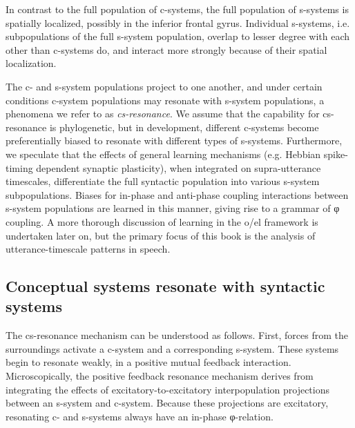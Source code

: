   In contrast to the full population of c-systems, the full population of s-systems is spatially localized, possibly in the inferior frontal gyrus. Individual s-systems, i.e. subpopulations of the full s-system population, overlap to lesser degree with each other than c-systems do, and interact more strongly because of their spatial localization. 

  The c- and s-system populations project to one another, and under certain conditions c-system populations may resonate with s-system populations, a phenomena we refer to as \textit{cs-resonance}. We assume that the capability for cs-resonance is phylogenetic, but in development, different c-systems become preferentially biased to resonate with different types of s-systems. Furthermore, we speculate that the effects of general learning mechanisms (e.g. Hebbian spike-timing dependent synaptic plasticity), when integrated on supra-utterance timescales, differentiate the full syntactic population into various s-system subpopulations. Biases for in-phase and anti-phase coupling interactions between s-system populations are learned in this manner, giving rise to a grammar of φ coupling. A more thorough discussion of learning in the o/el framework is undertaken later on, but the primary focus of this book is the analysis of utterance-timescale patterns in speech.

\subsection{Conceptual systems resonate with syntactic systems}

The cs-resonance mechanism can be understood as follows. First, forces from the surroundings activate a c-system and a corresponding s-system. These systems begin to resonate weakly, in a positive mutual feedback interaction. Microscopically, the positive feedback resonance mechanism derives from integrating the effects of excitatory-to-excitatory interpopulation projections between an s-system and c-system. Because these projections are excitatory, resonating c- and s-systems always have an in-phase φ-relation. 

